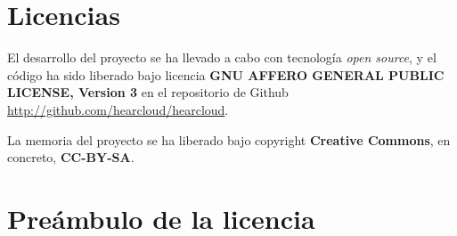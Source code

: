 \section{Licencias}
\label{sec:licencias}

El desarrollo del proyecto se ha llevado a cabo con tecnología \textit{open source}, y el código ha sido liberado bajo licencia \textbf{GNU AFFERO GENERAL PUBLIC LICENSE, Version 3} en el repositorio de Github \url{http://github.com/hearcloud/hearcloud}.

La memoria del proyecto se ha liberado bajo copyright \textbf{Creative Commons}, en concreto, \textbf{CC-BY-SA}.

\section{Preámbulo de la licencia}

\newpage